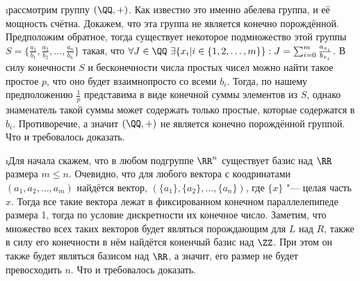 \i рассмотрим группу $(\QQ, +)$. Как известно это именно абелева группа, и её мощность счётна. Докажем, что эта группа не является конечно порождённой.\\
Предположим обратное, тогда существует некоторое подмножество этой группы $S = \{\frac{a_1}{b_1}, \frac{a_2}{b_2}, \ldots, \frac{a_n}{b_n}\}$ такая, что $\forall J \in \QQ\ \exists \{x_i| i \in \{1, 2, \ldots, m\}\}: J = \sum_{i=0}^{m} \frac{a_{x_i}}{b_{x_i}}$. В силу конечности $S$ и бесконечности числа простых чисел можно найти такое простое $p$, что оно будет взаимнопросто со всеми $b_i$. Тогда, по нашему предположению $\frac{1}{p}$ представима в виде конечной суммы элементов из $S$, однако знаменатель такой суммы может содержать только простые, которые содержатся в $b_i$. Противоречие, а значит $(\QQ, +)$ не является конечно порождённой группой. Что и требовалось доказать.

\i Для начала скажем, что в любом подгруппе $\RR^n$ существует базис над $\RR$ размера $m \leq n$. Очевидно, что для любого вектора с коодринатами $(a_1, a_2, \ldots, a_m)$ найдётся вектор, $(\{a_1\}, \{a_2\}, \ldots, \{a_n\})$, где $\{x\}$ "--- целая часть $x$. Тогда все такие вектора лежат в фиксированном конечном параллелепипеде размера 1, тогда по условие дискретности их конечное число. Заметим, что множество всех таких векторов будет являться порождающим для $L$ над $R$, также в силу его конечности в нём найдётся коненчый базис над $\ZZ$. При этом он также будет являться базисом над $\RR$, а значит, его размер не будет превосходить $n$. Что и требовалось доказать.
